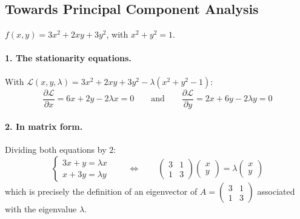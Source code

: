 \documentclass[]{article}
\begin{document}
	\subsection{Towards Principal Component Analysis}

	$f(x,y) = 3x^2 + 2xy + 3y^2$, with $x^2 + y^2 = 1$.

	\paragraph{1. The stationarity equations.}
	With $\mathcal{L}(x,y,\lambda) = 3x^2 + 2xy + 3y^2 - \lambda(x^2 + y^2 - 1)$:
	$$
	\frac{\partial \mathcal{L}}{\partial x} = 6x + 2y - 2\lambda x = 0
	\qquad \text{and} \qquad
	\frac{\partial \mathcal{L}}{\partial y} = 2x + 6y - 2\lambda y = 0
	$$

	\paragraph{2. In matrix form.}
	Dividing both equations by $2$:
	$$
	\begin{cases}
		3x + y = \lambda x \\
		x + 3y = \lambda y
	\end{cases}
	\qquad \Longleftrightarrow \qquad
	\begin{pmatrix} 3 & 1 \\ 1 & 3 \end{pmatrix}
	\begin{pmatrix} x \\ y \end{pmatrix}
	= \lambda
	\begin{pmatrix} x \\ y \end{pmatrix}
	$$
	which is precisely the definition of an eigenvector of $A = \begin{pmatrix} 3 & 1 \\ 1 & 3 \end{pmatrix}$ associated with the eigenvalue $\lambda$.
\end{document}
